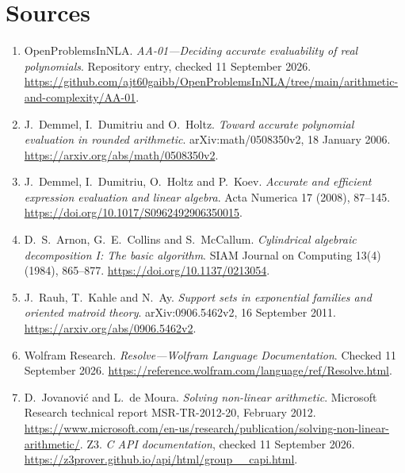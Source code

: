\documentclass[11pt,a4paper]{article}
\theoremstyle{definition}
\theoremstyle{remark}
\begin{document}
\section*{Sources}
\begingroup\small
\begin{enumerate}[label=\arabic*.]
\item OpenProblemsInNLA. \emph{AA-01---Deciding accurate evaluability of real
polynomials}. Repository entry, checked 11 September 2026.
\url{https://github.com/ajt60gaibb/OpenProblemsInNLA/tree/main/arithmetic-and-complexity/AA-01}.
\item J.~Demmel, I.~Dumitriu and O.~Holtz. \emph{Toward accurate polynomial
evaluation in rounded arithmetic}. arXiv:math/0508350v2, 18 January 2006.
\url{https://arxiv.org/abs/math/0508350v2}.
\item J.~Demmel, I.~Dumitriu, O.~Holtz and P.~Koev. \emph{Accurate and efficient
expression evaluation and linear algebra}. Acta Numerica 17 (2008), 87--145.
\url{https://doi.org/10.1017/S0962492906350015}.
\item D.~S.~Arnon, G.~E.~Collins and S.~McCallum. \emph{Cylindrical algebraic
decomposition I: The basic algorithm}. SIAM Journal on Computing 13(4)
(1984), 865--877. \url{https://doi.org/10.1137/0213054}.
\item J.~Rauh, T.~Kahle and N.~Ay. \emph{Support sets in exponential families
and oriented matroid theory}. arXiv:0906.5462v2, 16 September 2011.
\url{https://arxiv.org/abs/0906.5462v2}.
\item Wolfram Research. \emph{Resolve---Wolfram Language Documentation}.
Checked 11 September 2026.
\url{https://reference.wolfram.com/language/ref/Resolve.html}.
\item D.~Jovanovi\'c and L.~de Moura. \emph{Solving non-linear arithmetic}.
Microsoft Research technical report MSR-TR-2012-20, February 2012.
\url{https://www.microsoft.com/en-us/research/publication/solving-non-linear-arithmetic/}.
Z3. \emph{C API documentation}, checked 11 September 2026.
\url{https://z3prover.github.io/api/html/group__capi.html}.
\end{enumerate}
\endgroup
\end{document}
